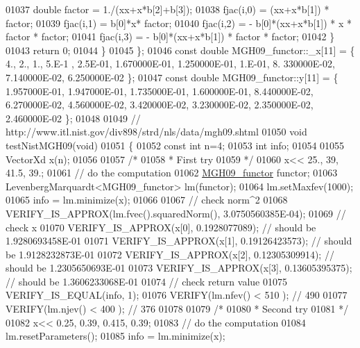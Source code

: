 \begin{DoxyCode}
01037             \textcolor{keywordtype}{double} factor = 1./(xx+x*b[2]+b[3]);
01038             fjac(i,0) = (xx+x*b[1]) * factor;
01039             fjac(i,1) = b[0]*x* factor;
01040             fjac(i,2) = - b[0]*(xx+x*b[1]) * x * factor * factor;
01041             fjac(i,3) = - b[0]*(xx+x*b[1]) * factor * factor;
01042         \}
01043         \textcolor{keywordflow}{return} 0;
01044     \}
01045 \};
01046 \textcolor{keyword}{const} \textcolor{keywordtype}{double} MGH09\_functor::\_x[11] = \{ 4., 2., 1., 5.E-1 , 2.5E-01, 1.670000E-01, 1.250000E-01,  1.E-01, 8.
      330000E-02, 7.140000E-02, 6.250000E-02 \};
01047 \textcolor{keyword}{const} \textcolor{keywordtype}{double} MGH09\_functor::y[11] = \{ 1.957000E-01, 1.947000E-01, 1.735000E-01, 1.600000E-01, 8.440000E-02,
       6.270000E-02, 4.560000E-02, 3.420000E-02, 3.230000E-02, 2.350000E-02, 2.460000E-02 \};
01048 
01049 \textcolor{comment}{// http://www.itl.nist.gov/div898/strd/nls/data/mgh09.shtml}
01050 \textcolor{keywordtype}{void} testNistMGH09(\textcolor{keywordtype}{void})
01051 \{
01052   \textcolor{keyword}{const} \textcolor{keywordtype}{int} n=4;
01053   \textcolor{keywordtype}{int} info;
01054 
01055   VectorXd x(n);
01056 
01057   \textcolor{comment}{/*}
01058 \textcolor{comment}{   * First try}
01059 \textcolor{comment}{   */}
01060   x<< 25., 39, 41.5, 39.;
01061   \textcolor{comment}{// do the computation}
01062   \hyperlink{struct_m_g_h09__functor}{MGH09\_functor} functor;
01063   LevenbergMarquardt<MGH09\_functor> lm(functor);
01064   lm.setMaxfev(1000);
01065   info = lm.minimize(x);
01066 
01067   \textcolor{comment}{// check norm^2}
01068   VERIFY\_IS\_APPROX(lm.fvec().squaredNorm(), 3.0750560385E-04);
01069   \textcolor{comment}{// check x}
01070   VERIFY\_IS\_APPROX(x[0], 0.1928077089); \textcolor{comment}{// should be 1.9280693458E-01}
01071   VERIFY\_IS\_APPROX(x[1], 0.19126423573); \textcolor{comment}{// should be 1.9128232873E-01}
01072   VERIFY\_IS\_APPROX(x[2], 0.12305309914); \textcolor{comment}{// should be 1.2305650693E-01}
01073   VERIFY\_IS\_APPROX(x[3], 0.13605395375); \textcolor{comment}{// should be 1.3606233068E-01}
01074   \textcolor{comment}{// check return value}
01075   VERIFY\_IS\_EQUAL(info, 1); 
01076   VERIFY(lm.nfev() < 510 ); \textcolor{comment}{// 490}
01077   VERIFY(lm.njev() < 400 ); \textcolor{comment}{// 376}
01078 
01079   \textcolor{comment}{/*}
01080 \textcolor{comment}{   * Second try}
01081 \textcolor{comment}{   */}
01082   x<< 0.25, 0.39, 0.415, 0.39;
01083   \textcolor{comment}{// do the computation}
01084   lm.resetParameters();
01085   info = lm.minimize(x);

\end{DoxyCode}

